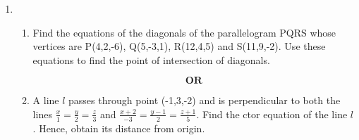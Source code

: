 \documentclass{article}
\begin{document}
\begin{enumerate}
	\item 
		\begin{enumerate}
		\item Find the equations of the diagonals of the parallelogram PQRS whose vertices are P(4,2,-6), Q(5,-3,1), R(12,4,5) and S(11,9,-2). Use these equations to find the point of intersection of diagonals.

		$$\textbf{OR}$$

	\item A line $l$ passes through point (-1,3,-2) and is perpendicular to both the lines $\frac {x}{1}=\frac{y}{2}=\frac{z}{3}$ and $\frac {x+2}{-3}=\frac{y-1}{2}=\frac{z+1}{5}$. Find the ctor equation of the line $l$. Hence, obtain its distance from origin.

		\end{enumerate}

\end{enumerate}
\end{document}
